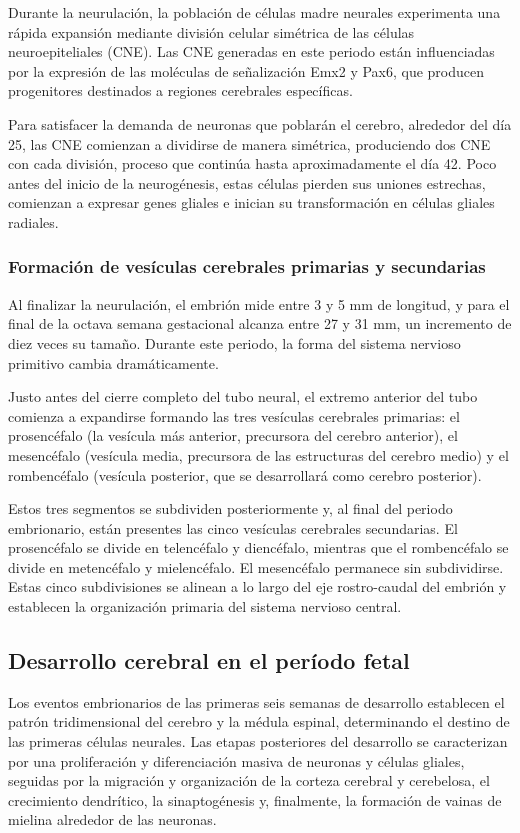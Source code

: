 \documentclass[11pt,letterpaper]{report}
\begin{document}
Durante la neurulación, la población de células madre neurales experimenta una
rápida expansión mediante división celular simétrica de las células
neuroepiteliales (CNE). Las CNE generadas en este periodo están influenciadas
por la expresión de las moléculas de señalización Emx2 y Pax6, que producen
progenitores destinados a regiones cerebrales específicas. \cite{Gibb2018}

Para satisfacer la demanda de neuronas que poblarán el cerebro, alrededor del
día 25, las CNE comienzan a dividirse de manera simétrica, produciendo dos
CNE con cada división, proceso que continúa hasta aproximadamente el día 42.
Poco antes del inicio de la neurogénesis, estas células pierden sus uniones
estrechas, comienzan a expresar genes gliales e inician su transformación en
células gliales radiales. \cite{Stiles2010}

\subsubsection{Formación de vesículas cerebrales primarias y secundarias}
Al finalizar la neurulación, el embrión mide entre 3 y 5 mm de longitud, y para
el final de la octava semana gestacional alcanza entre 27 y 31 mm, un
incremento de diez veces su tamaño. Durante este periodo, la forma del sistema
nervioso primitivo cambia dramáticamente. \cite{Stiles2010}

Justo antes del cierre completo del tubo neural, el extremo anterior del tubo
comienza a expandirse formando las tres vesículas cerebrales primarias: el
prosencéfalo (la vesícula más anterior, precursora del cerebro anterior), el
mesencéfalo (vesícula media, precursora de las estructuras del cerebro medio) y
el rombencéfalo (vesícula posterior, que se desarrollará como cerebro
posterior). \cite{Stiles2010}

Estos tres segmentos se subdividen posteriormente y, al final del periodo
embrionario, están presentes las cinco vesículas cerebrales secundarias. El
prosencéfalo se divide en telencéfalo y diencéfalo, mientras que el
rombencéfalo se divide en metencéfalo y mielencéfalo. El mesencéfalo permanece
sin subdividirse. Estas cinco subdivisiones se alinean a lo largo del eje
rostro-caudal del embrión y establecen la organización primaria del sistema
nervioso central. \cite{Stiles2010}

\subsection{Desarrollo cerebral en el período fetal}
Los eventos embrionarios de las primeras seis semanas de desarrollo establecen
el patrón tridimensional del cerebro y la médula espinal, determinando el
destino de las primeras células neurales. Las etapas posteriores del desarrollo
se caracterizan por una proliferación y diferenciación masiva de neuronas y
células gliales, seguidas por la migración y organización de la corteza
cerebral y cerebelosa, el crecimiento dendrítico, la sinaptogénesis y,
finalmente, la formación de vainas de mielina alrededor de las neuronas.
\cite{Polin124}
\end{document}
